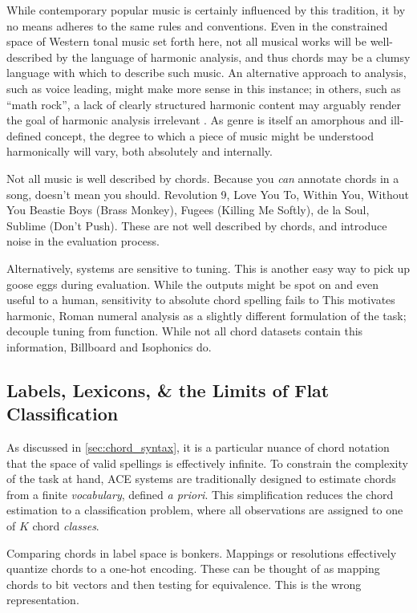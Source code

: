 \documentclass{article}
\begin{document}
While contemporary popular music is certainly influenced by this tradition, it by no means adheres to the same rules and conventions.
Even in the constrained space of Western tonal music set forth here, not all musical works will be well-described by the language of harmonic analysis, and thus chords may be a clumsy language with which to describe such music.
An alternative approach to analysis, such as voice leading, might make more sense in this instance;
in others, such as ``math rock'', a lack of clearly structured harmonic content may arguably render the goal of harmonic analysis irrelevant \cite{Cateforis2002Alternative}.
As genre is itself an amorphous and ill-defined concept, the degree to which a piece of music might be understood harmonically will vary, both absolutely and internally.

Not all music is well described by chords.
Because you \emph{can} annotate chords in a song, doesn't mean you should.
Revolution 9, Love You To, Within You, Without You Beastie Boys (Brass Monkey), Fugees (Killing Me Softly), de la Soul, Sublime (Don't Push).
These are not well described by chords, and introduce noise in the evaluation process.

Alternatively, systems are sensitive to tuning.
This is another easy way to pick up goose eggs during evaluation.
While the outputs might be spot on and even useful to a human, sensitivity to absolute chord spelling fails to
This motivates harmonic, Roman numeral analysis as a slightly different formulation of the task; decouple tuning from function.
While not all chord datasets contain this information, Billboard and Isophonics do.





\subsection{Labels, Lexicons, \& the Limits of Flat Classification}

As discussed in \ref{sec:chord_syntax}, it is a particular nuance of chord notation that the space of valid spellings is effectively infinite.
To constrain the complexity of the task at hand, ACE systems are traditionally designed to estimate chords from a finite \emph{vocabulary}, defined \emph{a priori}.
This simplification reduces the chord estimation to a classification problem, where all observations are assigned to one of $K$ chord \emph{classes}.

Comparing chords in label space is bonkers.
Mappings or resolutions effectively quantize chords to a one-hot encoding.
These can be thought of as mapping chords to bit vectors and then testing for equivalence.
This is the wrong representation.
\end{document}
